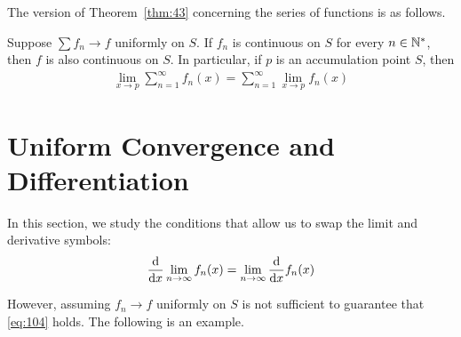 \documentclass[thmcnt=section, 12pt]{my-elegantbook}
\begin{document}

The version of Theorem~\ref{thm:43} concerning the series of functions is as follows.

\begin{theorem} \label{thm:65}
    Suppose $\sum f_n \to f$ uniformly on $S$. If $f_n$ is continuous on $S$ for every $n \in \mathbb{N}^\ast$, then $f$ is also continuous on $S$. In particular, if $p$ is an accumulation point $S$, then
    \begin{align*}
        \lim_{x \to p} \sum_{n=1}^\infty f_n(x)
        = \sum_{n=1}^\infty \lim_{x \to p} f_n(x)
    \end{align*}
\end{theorem}


\section{Uniform Convergence and Differentiation}

In this section, we study the conditions that allow us to swap the limit and derivative symbols:
\begin{align}
    \odvs{\lim_{n \to \infty} f_n(x)}{x}
    = \lim_{n \to \infty} \odvs{f_n(x)}{x}
    \label{eq:104}
\end{align}

However, assuming $f_n \to f$ uniformly on $S$ is not sufficient to guarantee that \eqref{eq:104} holds. The following is an example.
\end{document}
